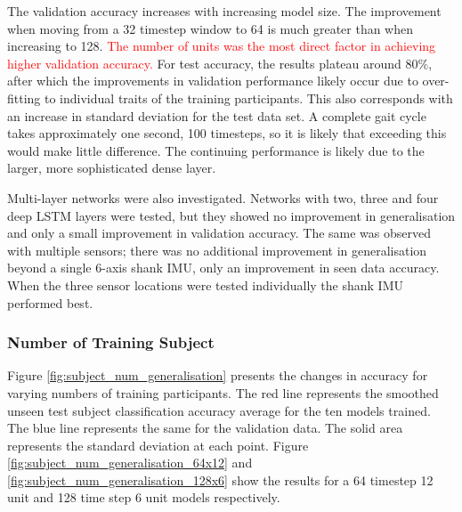 \documentclass[sensors,article,submit,moreauthors,pdftex]{Definitions/mdpi}
\begin{document}
The validation accuracy increases with increasing model size. The improvement when moving from a 32 timestep window to 64 is much greater than when increasing to 128. \textcolor{red}{The number of units was the most direct factor in achieving higher validation accuracy.} For test accuracy, the results plateau around 80\%, after which the improvements in validation performance likely occur due to over-fitting to individual traits of the training participants. This also corresponds with an increase in standard deviation for the test data set. A complete gait cycle takes approximately one second, 100 timesteps, so it is likely that exceeding this would make little difference. The continuing performance is likely due to the larger, more sophisticated dense layer.

Multi-layer networks were also investigated. Networks with two, three and four deep LSTM layers were tested, but they showed no improvement in generalisation and only a small improvement in validation accuracy. The same was observed with multiple sensors; there was no additional improvement in generalisation beyond a single 6-axis shank IMU, only an improvement in seen data accuracy. When the three sensor locations were tested individually the shank IMU performed best.


\subsubsection{Number of Training Subject}
Figure \ref{fig:subject_num_generalisation} presents the changes in accuracy for varying numbers of training participants. The red line represents the smoothed unseen test subject classification accuracy average for the ten models trained. The blue line represents the same for the validation data. The solid area represents the standard deviation at each point. Figure \ref{fig:subject_num_generalisation_64x12} and \ref{fig:subject_num_generalisation_128x6} show the results for a 64 timestep 12 unit and 128 time step 6 unit models respectively.
\end{document}

